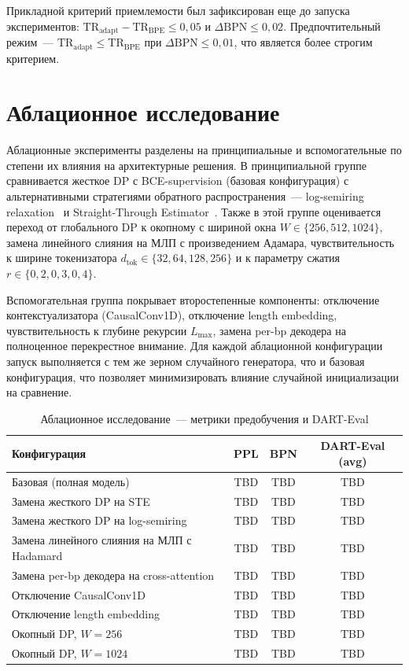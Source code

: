 Прикладной критерий приемлемости был зафиксирован еще до запуска
экспериментов: $\mathrm{TR}_{\text{adapt}} - \mathrm{TR}_{\text{BPE}}
\leq 0{,}05$ и $\Delta \mathrm{BPN} \leq 0{,}02$. Предпочтительный
режим~--- $\mathrm{TR}_{\text{adapt}} \leq \mathrm{TR}_{\text{BPE}}$ при
$\Delta \mathrm{BPN} \leq 0{,}01$, что является более строгим
критерием.

\section{Аблационное исследование}

Аблационные эксперименты разделены на принципиальные и вспомогательные
по степени их влияния на архитектурные решения. В принципиальной
группе сравнивается жесткое DP с BCE-supervision (базовая
конфигурация) с альтернативными стратегиями обратного
распространения~--- log-semiring
relaxation~\cite{menschDifferentiableDynamicProgramming2018} и
Straight-Through Estimator~\cite{bengioEstimatingPropagatingGradients2013}.
Также в этой группе оценивается переход от глобального DP к окопному с
шириной окна $W \in \{256, 512, 1024\}$, замена линейного слияния на
МЛП с произведением Адамара, чувствительность к ширине токенизатора
$d_{\text{tok}} \in \{32, 64, 128, 256\}$ и к параметру сжатия $r \in
\{0{,}2, 0{,}3, 0{,}4\}$.

Вспомогательная группа покрывает второстепенные компоненты: отключение
контекстуализатора (CausalConv1D), отключение length embedding,
чувствительность к глубине рекурсии $L_{\max}$, замена per-bp декодера
на полноценное перекрестное внимание. Для каждой аблационной
конфигурации запуск выполняется с тем же зерном случайного генератора,
что и базовая конфигурация, что позволяет минимизировать влияние
случайной инициализации на сравнение.

\begin{table}[h]
\centering
\caption{Аблационное исследование~--- метрики предобучения и DART-Eval}
\label{tab:ablation}
\begin{tabular}{lccc}
\toprule
Конфигурация & PPL & BPN & DART-Eval (avg) \\
\midrule
Базовая (полная модель) & TBD & TBD & TBD \\
Замена жесткого DP на STE & TBD & TBD & TBD \\
Замена жесткого DP на log-semiring & TBD & TBD & TBD \\
Замена линейного слияния на МЛП с Hadamard & TBD & TBD & TBD \\
Замена per-bp декодера на cross-attention & TBD & TBD & TBD \\
Отключение CausalConv1D & TBD & TBD & TBD \\
Отключение length embedding & TBD & TBD & TBD \\
Окопный DP, $W = 256$ & TBD & TBD & TBD \\
Окопный DP, $W = 1024$ & TBD & TBD & TBD \\
\bottomrule
\end{tabular}
\end{table}

